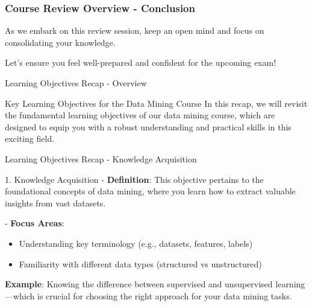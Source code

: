 \documentclass[aspectratio=169]{beamer}
\begin{document}
\begin{frame}[fragile]
    \frametitle{Course Review Overview - Conclusion}
    As we embark on this review session, keep an open mind and focus on consolidating your knowledge. 

    Let’s ensure you feel well-prepared and confident for the upcoming exam!
\end{frame}

\begin{frame}[fragile]{Learning Objectives Recap - Overview}
    \begin{block}{Key Learning Objectives for the Data Mining Course}
        In this recap, we will revisit the fundamental learning objectives of our data mining course, which are designed to equip you with a robust understanding and practical skills in this exciting field.
    \end{block}
\end{frame}

\begin{frame}[fragile]{Learning Objectives Recap - Knowledge Acquisition}
    \begin{block}{1. Knowledge Acquisition}
        - \textbf{Definition}: This objective pertains to the foundational concepts of data mining, where you learn how to extract valuable insights from vast datasets.
        
        - \textbf{Focus Areas}: 
        \begin{itemize}
            \item Understanding key terminology (e.g., datasets, features, labels)
            \item Familiarity with different data types (structured vs unstructured)
        \end{itemize}
        
        \textbf{Example}: Knowing the difference between supervised and unsupervised learning—which is crucial for choosing the right approach for your data mining tasks.
    \end{block}
\end{frame}
\end{document}
